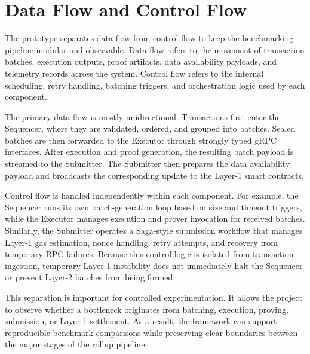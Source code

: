 
\section{Data Flow and Control Flow}
\label{sec:data_control_flow}

The prototype separates data flow from control flow to keep the benchmarking pipeline modular and observable. Data flow refers to the movement of transaction batches, execution outputs, proof artifacts, data availability payloads, and telemetry records across the system. Control flow refers to the internal scheduling, retry handling, batching triggers, and orchestration logic used by each component.

The primary data flow is mostly unidirectional. Transactions first enter the Sequencer, where they are validated, ordered, and grouped into batches. Sealed batches are then forwarded to the Executor through strongly typed gRPC interfaces. After execution and proof generation, the resulting batch payload is streamed to the Submitter. The Submitter then prepares the data availability payload and broadcasts the corresponding update to the Layer-1 smart contracts.

Control flow is handled independently within each component. For example, the Sequencer runs its own batch-generation loop based on size and timeout triggers, while the Executor manages execution and prover invocation for received batches. Similarly, the Submitter operates a Saga-style submission workflow that manages Layer-1 gas estimation, nonce handling, retry attempts, and recovery from temporary RPC failures. Because this control logic is isolated from transaction ingestion, temporary Layer-1 instability does not immediately halt the Sequencer or prevent Layer-2 batches from being formed.

This separation is important for controlled experimentation. It allows the project to observe whether a bottleneck originates from batching, execution, proving, submission, or Layer-1 settlement. As a result, the framework can support reproducible benchmark comparisons while preserving clear boundaries between the major stages of the rollup pipeline.


